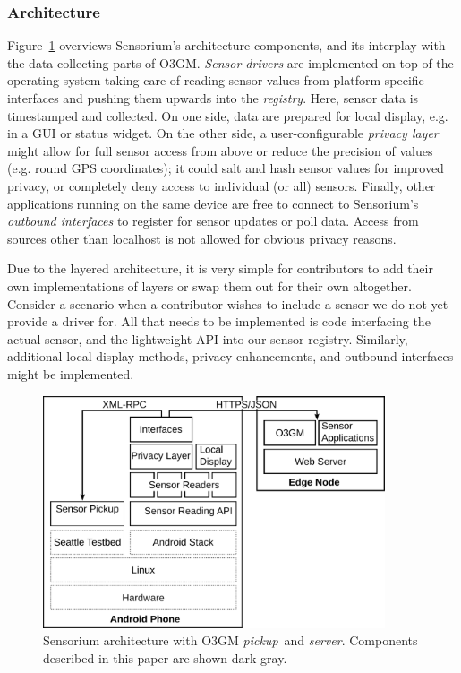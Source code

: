 \subsubsection{Architecture}

Figure~\ref{c5:fig:architecture} overviews Sensorium's architecture components, and its interplay with the data collecting parts of O3GM. \textit{Sensor drivers} are implemented on top of the operating system taking care of reading sensor values from platform-specific interfaces and pushing them upwards into the \textit{registry}. Here, sensor data is timestamped and collected. On one side, data are prepared for local display, e.g. in a \gls{GUI} or status widget. On the other side, a user-configurable \textit{privacy layer} might allow for full sensor access from above or reduce the precision of values (e.g. round \gls{GPS} coordinates); it could salt and hash sensor values for improved privacy, or completely deny access to individual (or all) sensors. Finally, other applications running on the same device are free to connect to Sensorium's \textit{outbound interfaces} to register for sensor updates or poll data. Access from sources other than localhost is not allowed for obvious privacy reasons.

Due to the layered architecture, it is very simple for contributors to add their own implementations of layers or swap them out for their own altogether. Consider a scenario when a contributor wishes to include a sensor we do not yet provide a driver for. All that needs to be implemented is code interfacing the actual sensor, and the lightweight API into our sensor registry. Similarly, additional local display methods, privacy enhancements, and outbound interfaces might be implemented.

\begin{figure}[htb]
\centering
\includegraphics[width=0.9\textwidth]{images/sensorium-arch.pdf}
\caption{Sensorium architecture with O3GM \textit{pickup}~and \textit{server}. Components described in this paper are shown dark gray.}
\label{c5:fig:architecture}
\end{figure}

